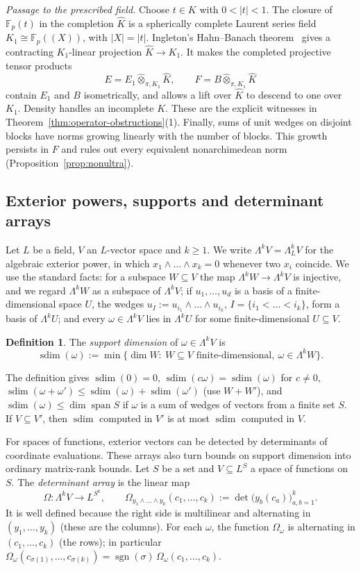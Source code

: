 \documentclass[11pt]{amsart}
\theoremstyle{definition}
\newtheorem{definition}[theorem]{Definition}
\theoremstyle{remark}
\numberwithin{equation}{section}
\newcommand{\F}{\mathbb F}
\newcommand{\sgn}{\operatorname{sgn}}
\newcommand{\spn}{\operatorname{span}}
\newcommand{\abs}[1]{\lvert #1\rvert}
\newcommand{\sdim}{\operatorname{sdim}}
\newcommand{\Kh}{\widehat K}
\begin{document}
\emph{Passage to the prescribed field.}
Choose $t\in K$ with $0<\abs t<1$. The closure of $\F_p(t)$ in the completion $\Kh$ is a spherically complete
Laurent series field $K_1\cong\F_p((X))$, with $\abs X=\abs t$. Ingleton's Hahn--Banach theorem~\cite{In} gives a
contracting $K_1$\nobreakdash-linear projection $\Kh\to K_1$. It makes the completed projective tensor products
\[
E=E_1\widehat\otimes_{\pi,K_1}\Kh,\qquad
F=B\widehat\otimes_{\pi,K_1}\Kh
\]
contain $E_1$ and $B$ isometrically, and allows a lift over $\Kh$ to descend to one over $K_1$. Density handles an
incomplete $K$. These are the explicit witnesses in Theorem~\ref{thm:operator-obstructions}(1). Finally, sums of unit wedges on disjoint
blocks have norms growing linearly with the number of blocks. This growth persists in $F$ and rules out every
equivalent nonarchimedean norm (Proposition~\ref{prop:nonultra}).

\subsection{Exterior powers, supports and determinant arrays}\label{ssec:ext}
Let $L$ be a field, $V$ an $L$\nobreakdash-vector space and $k\ge1$. We write $\Lambda^kV=\Lambda^k_LV$ for the algebraic exterior
power, in which $x_1\wedge\dots\wedge x_k=0$ whenever two $x_i$ coincide. We use the standard facts: for a subspace
$W\subseteq V$ the map $\Lambda^kW\to\Lambda^kV$ is injective, and we regard $\Lambda^kW$ as a subspace of $\Lambda^kV$;
if $u_1,\dots,u_d$ is a basis of a finite-dimensional space $U$, the wedges $u_I:=u_{i_1}\wedge\dots\wedge u_{i_k}$,
$I=\{i_1<\dots<i_k\}$, form a basis of $\Lambda^kU$; and every $\omega\in\Lambda^kV$ lies in $\Lambda^kU$ for some
finite-dimensional $U\subseteq V$.

\begin{definition}\label{def:supp}
The \emph{support dimension} of $\omega\in\Lambda^kV$ is
\[
\sdim(\omega):=\min\{\dim W:\ W\subseteq V\text{ finite-dimensional},\ \omega\in\Lambda^kW\}.
\]
\end{definition}

The definition gives $\sdim(0)=0$, $\sdim(c\omega)=\sdim(\omega)$ for $c\neq0$, $\sdim(\omega+\omega')\le\sdim(\omega)+\sdim(\omega')$
(use $W+W'$), and $\sdim(\omega)\le\dim\spn S$ if $\omega$ is a sum of wedges of vectors from a finite set $S$. If
$V\subseteq V'$, then $\sdim$ computed in $V'$ is at most $\sdim$ computed in $V$.

For spaces of functions, exterior vectors can be detected by determinants of coordinate evaluations. These arrays
also turn bounds on support dimension into ordinary matrix-rank bounds.
Let $S$ be a set and $V\subseteq L^S$ a space of functions on $S$. The \emph{determinant array} is the linear map
\[
\Omega\colon\Lambda^kV\to L^{S^k},\qquad \Omega_{y_1\wedge\dots\wedge y_k}(c_1,\dots,c_k):=\det\bigl(y_b(c_a)\bigr)_{a,b=1}^k .
\]
It is well defined because the right side is multilinear and alternating in $(y_1,\dots,y_k)$ (these are the
columns). For each $\omega$, the function $\Omega_\omega$ is alternating in $(c_1,\dots,c_k)$ (the rows); in particular
$\Omega_\omega(c_{\sigma(1)},\dots,c_{\sigma(k)})=\sgn(\sigma)\,\Omega_\omega(c_1,\dots,c_k)$.
\end{document}

